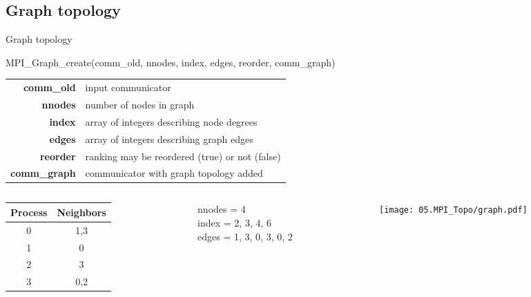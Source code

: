 \documentclass[aspectratio=43]{beamer}
\begin{document}
\subsection{Graph topology}
\begin{frame}[fragile]{Graph topology}
\begin{Pseudolisting}[]{}
MPI_Graph_create(comm_old, nnodes, index, edges, reorder,
                 comm_graph)
\end{Pseudolisting}
\begin{black1block}{}
\begin{tabular}{rp{8cm}}
\textbf{comm\_old} & input communicator\\
\textbf{nnodes} & number of nodes in graph\\
\textbf{index} & array of integers describing node degrees\\
\textbf{edges} & array of integers describing graph edges\\
\textbf{reorder} & ranking may be reordered (true) or not (false)\\
\textbf{comm\_graph} & communicator with graph topology added\\
\end{tabular}
\end{black1block}
\begin{columns}
\begin{column}{0.3\paperwidth}
\begin{tabular}{|c|c|}\hline
    Process & Neighbors\\\hline
    0 & 1,3\\\hline
    1 & 0\\\hline
    2 & 3\\\hline
    3 & 0,2\\\hline
\end{tabular}
\end{column}

\begin{column}{0.3\paperwidth}
\begin{black1block}{}
nnodes = 4\\
index = 2, 3, 4, 6\\
edges = 1, 3, 0, 3, 0, 2\\
\end{black1block}
\end{column}

    \begin{column}{0.2\paperwidth}
\texttt{[image: 05.MPI\_Topo/graph.pdf]}
    \end{column}
\end{columns}

\end{frame}
\end{document}
